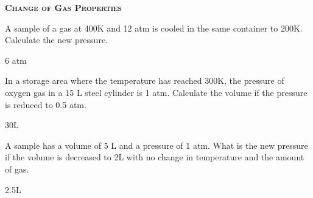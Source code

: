 \documentclass[main.tex]{subfiles}
\begin{document}
\begin{multicols*}{2}
{\raggedright\textsc{\textbf{Change of Gas Properties }}\par}
\begin{question}[ID=\the\value{numA}]
A sample of a gas at 400K and 12 atm is cooled in the same container to 200K. Calculate the new pressure.
\end{question}
\begin{solution}
6 atm
\hspace{0.1cm}\end{solution}%
\begin{question}[ID=\the\value{numA}]
In a storage area where the temperature has reached 300K, the pressure of oxygen gas in a 15 L steel cylinder is 1 atm. Calculate the volume if the pressure is reduced to 0.5 atm.
\end{question}
\begin{solution}
30L
\hspace{0.1cm}\end{solution}%

\begin{question}[ID=\the\value{numA}]
A  sample has a volume of 5 L and a pressure of 1 atm. What is the new pressure if the volume is decreased to 2L with no change in temperature and the amount of gas. 
\end{question}
\begin{solution}
2.5L
\hspace{0.1cm}\end{solution}%





\end{multicols*}
\end{document}
